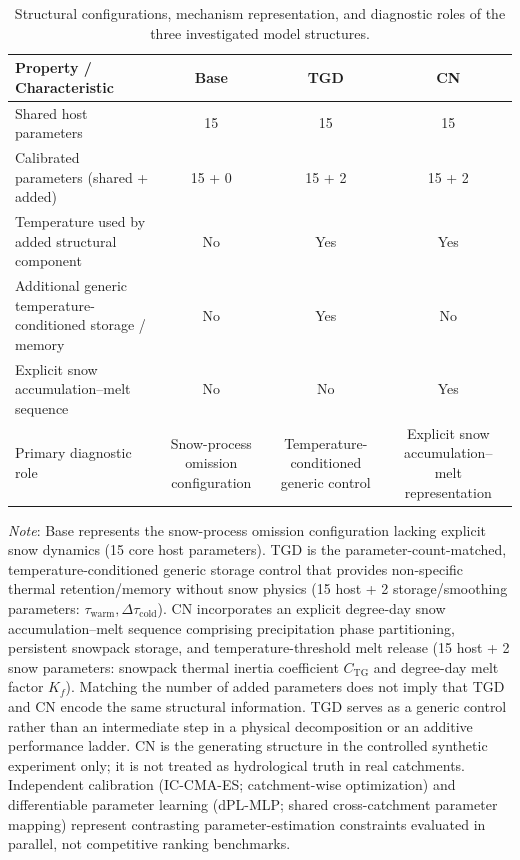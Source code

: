 \begin{table}[t]
\centering
\small
\begin{threeparttable}
\caption{Structural configurations, mechanism representation, and diagnostic roles of the three investigated model structures.}
\label{tab:structural_configurations}
\begin{tabular}{lccc}
\toprule
Property / Characteristic & Base & TGD & CN \\
\midrule
Shared host parameters & 15 & 15 & 15 \\
Calibrated parameters (shared + added) & 15 + 0 & 15 + 2 & 15 + 2 \\
Temperature used by added structural component & No & Yes & Yes \\
Additional generic temperature-conditioned storage / memory & No & Yes & No \\
Explicit snow accumulation–melt sequence & No & No & Yes \\
Primary diagnostic role & Snow-process omission configuration & Temperature-conditioned generic control & Explicit snow accumulation–melt representation \\
\bottomrule
\end{tabular}
\begin{tablenotes}[flushleft]
\footnotesize
\item \textit{Note}: Base represents the snow-process omission configuration lacking explicit snow dynamics (15 core host parameters). TGD is the parameter-count-matched, temperature-conditioned generic storage control that provides non-specific thermal retention/memory without snow physics (15 host + 2 storage/smoothing parameters: $\tau_{\mathrm{warm}}, \Delta\tau_{\mathrm{cold}}$). CN incorporates an explicit degree-day snow accumulation--melt sequence comprising precipitation phase partitioning, persistent snowpack storage, and temperature-threshold melt release (15 host + 2 snow parameters: snowpack thermal inertia coefficient $C_{\mathrm{TG}}$ and degree-day melt factor $K_f$). Matching the number of added parameters does not imply that TGD and CN encode the same structural information. TGD serves as a generic control rather than an intermediate step in a physical decomposition or an additive performance ladder. CN is the generating structure in the controlled synthetic experiment only; it is not treated as hydrological truth in real catchments. Independent calibration (IC-CMA-ES; catchment-wise optimization) and differentiable parameter learning (dPL-MLP; shared cross-catchment parameter mapping) represent contrasting parameter-estimation constraints evaluated in parallel, not competitive ranking benchmarks.
\end{tablenotes}
\end{threeparttable}
\end{table}
